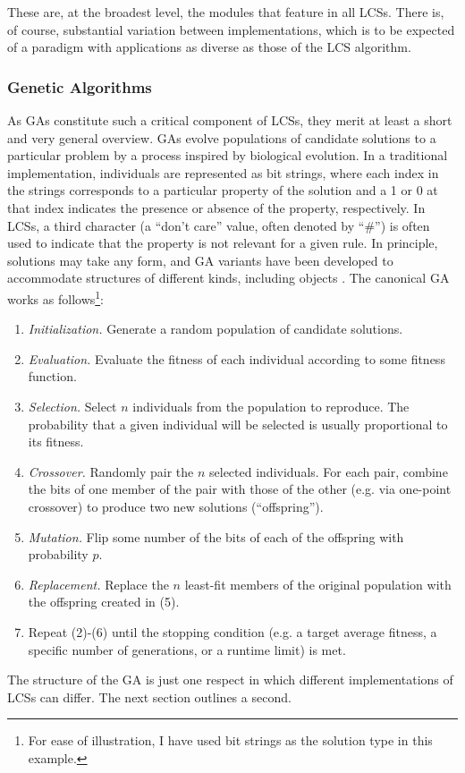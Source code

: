 \documentclass[12pt]{article}
\begin{document}
These are, at the broadest level, the modules that feature in all LCSs. There is, of course, substantial variation between implementations, which is to be expected of a paradigm with applications as diverse as those of the LCS algorithm.

\subsubsection{Genetic Algorithms}

As GAs constitute such a critical component of LCSs, they merit at least a short and very general overview. GAs evolve populations of candidate solutions to a particular problem by a process inspired by biological evolution. In a traditional implementation, individuals are represented as bit strings, where each index in the strings corresponds to a particular property of the solution and a 1 or 0 at that index indicates the presence or absence of the property, respectively. In LCSs, a third character (a ``don't care'' value, often denoted by ``\#'') is often used to indicate that the property is not relevant for a given rule. In principle, solutions may take any form, and GA variants have been developed to accommodate structures of different kinds, including objects \cite{keijzer_evolving_2001}. The canonical GA works as follows\footnote{For ease of illustration, I have used bit strings as the solution type in this example.}:
\begin{enumerate}
\item \emph{Initialization.} Generate a random population of candidate solutions.
\item \emph{Evaluation.} Evaluate the fitness of each individual according to some fitness function.
\item \emph{Selection.} Select $n$ individuals from the population to reproduce. The probability that a given individual will be selected is usually proportional to its fitness.
\item \emph{Crossover.} Randomly pair the $n$ selected individuals. For each pair, combine the bits of one member of the pair with those of the other (e.g. via one-point crossover) to produce two new solutions (``offspring'').
\item \emph{Mutation.} Flip some number of the bits of each of the offspring with probability $p$.
\item \emph{Replacement.} Replace the $n$ least-fit members of the original population with the offspring created in (5).
\item Repeat (2)-(6) until the stopping condition (e.g. a target average fitness, a specific number of generations, or a runtime limit) is met.
\end{enumerate}
The structure of the GA is just one respect in which different implementations of LCSs can differ. The next section outlines a second.
\end{document}
